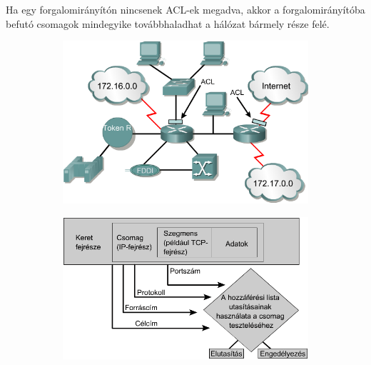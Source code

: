 Ha egy forgalomirányítón nincsenek ACL-ek megadva, akkor a forgalomirányítóba befutó csomagok mindegyike továbbhaladhat a hálózat bármely része felé.
\begin{figure}[h]
	\centering
	\begin{subfigure}{0.45\linewidth}
		\includegraphics[width=\linewidth]{fig/16-ACL}
		\caption{}
	\end{subfigure}
	\begin{subfigure}{0.45\linewidth}
		\includegraphics[width=\linewidth]{fig/16-ACL_list-schema}
		\caption{}
	\end{subfigure}
	\caption{}
\end{figure}

